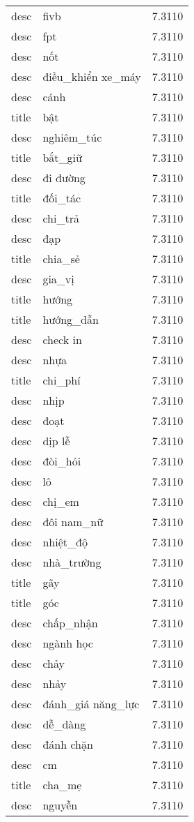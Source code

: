 \documentclass{article}
\begin{document}
\begin{tabular}{lll}
desc & fivb & 7.3110\\
desc & fpt & 7.3110\\
desc & nốt & 7.3110\\
desc & điều\_khiển xe\_máy & 7.3110\\
desc & cánh & 7.3110\\
title & bật & 7.3110\\
desc & nghiêm\_túc & 7.3110\\
title & bắt\_giữ & 7.3110\\
desc & đi đường & 7.3110\\
title & đối\_tác & 7.3110\\
desc & chi\_trả & 7.3110\\
desc & đạp & 7.3110\\
title & chia\_sẻ & 7.3110\\
desc & gia\_vị & 7.3110\\
title & hướng & 7.3110\\
title & hướng\_dẫn & 7.3110\\
desc & check in & 7.3110\\
desc & nhựa & 7.3110\\
title & chi\_phí & 7.3110\\
desc & nhịp & 7.3110\\
desc & đoạt & 7.3110\\
desc & dịp lễ & 7.3110\\
desc & đòi\_hỏi & 7.3110\\
desc & lô & 7.3110\\
desc & chị\_em & 7.3110\\
desc & đôi nam\_nữ & 7.3110\\
desc & nhiệt\_độ & 7.3110\\
desc & nhà\_trường & 7.3110\\
title & gãy & 7.3110\\
title & góc & 7.3110\\
desc & chấp\_nhận & 7.3110\\
desc & ngành học & 7.3110\\
desc & chảy & 7.3110\\
desc & nhảy & 7.3110\\
desc & đánh\_giá năng\_lực & 7.3110\\
desc & dễ\_dàng & 7.3110\\
desc & đánh chặn & 7.3110\\
desc & cm & 7.3110\\
title & cha\_mẹ & 7.3110\\
desc & nguyễn & 7.3110\\

\end{tabular}
\end{document}
